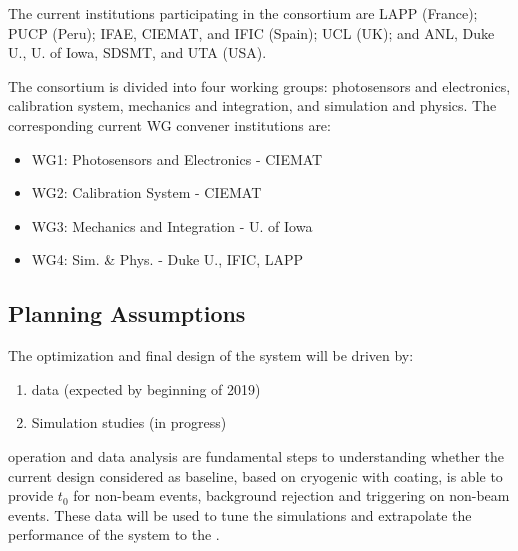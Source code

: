 The current institutions participating in the \dual {} consortium are LAPP (France); PUCP (Peru); IFAE, CIEMAT, and IFIC (Spain); UCL (UK); and ANL, Duke U., U. of Iowa, SDSMT, and UTA (USA).




The \dual {} consortium is divided into four working groups: photosensors and electronics, calibration system, mechanics and integration, and simulation and physics. The corresponding current WG convener institutions are:
\begin{itemize}
\item WG1: Photosensors and Electronics -  CIEMAT %
\item WG2: Calibration System -  CIEMAT %
\item WG3: Mechanics and Integration - U. of Iowa %
\item WG4: Sim. \& Phys. - %
Duke U., %
IFIC, %
LAPP

\end{itemize}


\subsection{Planning Assumptions}
\label{sec:fddp-pd-12.2}

The optimization and final design of the \dual {} system will be driven by:
\begin{enumerate}
\item {} data (expected by beginning of 2019)
\item Simulation studies (in progress)
\end{enumerate}

 operation and data analysis are fundamental steps to understanding whether the current  design considered as baseline, based on cryogenic  with  coating, is able to provide $t_0$ for non-beam events, background rejection and triggering on non-beam events. These data will be used to tune the  simulations and extrapolate the performance of the system to the . 

